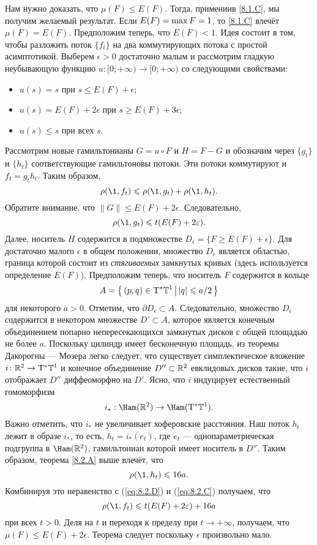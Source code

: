 Нам нужно доказать, что $\mu (F) \le E (F)$.
Тогда, примениив \ref{8.1.C}, мы получим желаемый результат.
Если $E (F) \z= \max F = 1$, то \ref{8.1.C} влечёт $\mu (F) = E (F)$.
Предположим теперь, что $E (F) <1$.
Идея состоит в том, чтобы разложить поток $\{f_t\}$ на два
коммутирующих потока с простой асимптотикой. 
Выберем $\epsilon> 0$ достаточно малым и рассмотрим гладкую
неубывающую функцию $u: [0; + \infty) \to [0; + \infty)$ со следующими
    свойствами:  
\begin{itemize}
\item $u (s) = s$ при $s \le E (F) + \epsilon$;
\item $u (s) = E (F) + 2\epsilon$ при $s \ge E (F) + 3\epsilon$;
\item $u (s) \le s$ при всех $s$.
\end{itemize}
Рассмотрим новые гамильтонианы $G = u \circ F$ и $H = F - G$ и
обозначим через $\{g_t\}$ и $\{h_t\}$ соответствующие гамильтоновы
потоки. 
Эти потоки коммутируют и $f_t = g_t h_t$. 
Таким образом, 
\begin{equation}\rho (\1, f_t) \le \rho (\1, g_t) + \rho (\1, h_t).
\label{eq:8.2.C}
\end{equation}
Обратите внимание, что $\| G \| \le E (F) + 2\epsilon$.
Следовательно, 
\begin{equation}
 \rho (\1, g_t) \le t (E (F) + 2\epsilon).
\label{eq:8.2.D}
\end{equation}
Далее, носитель $H$ содержится в подмножестве $D_\epsilon = \{F \ge E
(F) + \epsilon\}$. 
Для достаточно малого $\epsilon$ в общем положении, множество
$D_\epsilon$ является областью, граница которой состоит из {}\emph{стягиваемых}
замкнутых кривых (здесь используется определение $E(F)$). 
Предположим теперь, что носитель $F$ содержится в кольце 
\[A = \left\{ \,{(p, q) \in \mathrm{T}^\ast\mathbb{T}^1}\, \middle| \,{| q | \leqslant a / 2}\, \right\}\]
для некоторого $a> 0$. 
Отметим, что $\partial D_\epsilon \subset A$.
Следовательно, множество $D_\epsilon$ содержится в некотором множестве
$D' \subset A$, которое является конечным объединением попарно
непересекающихся замкнутых дисков с общей площадью не более $a$. 
Поскольку цилиндр имеет бесконечную площадь, из теоремы
Дакорогны --- Мозера \cite[1.6]{HZ} легко следует, что существует
симплектическое вложение $i\colon \mathbb{R}^2 \to\mathrm{T}^\ast \mathbb{T}^1$ и конечное
объединение $D'' \subset \mathbb{R}^2$ евклидовых дисков такие, что $i$
отображает $D''$ диффеоморфно на $D'$. 
Ясно, что $i$ индуцирует естественный гомоморфизм 
\[i_\ast: \Ham (\RR^2) \to \Ham (\T^\ast \TT^1).\]
Важно отметить, что $i_\ast$ не увеличивает хоферовские расстояния.
Наш поток $h_t$ лежит в образе $i_\ast$, то есть, $h_t = i_\ast (e_{t})$,
где $e_{t}$ --- однопараметрическая подгруппа в $\Ham (\RR^2)$,
гамильтониан которой имеет носитель в $D''$. 
Таким образом, теорема \ref{8.2.A} выше влечёт, что 
\[
\rho (\1, h_t) \le 16a.
\]
Комбинируя это неравенство с (\ref{eq:8.2.D}) и (\ref{eq:8.2.C}) получаем, что
\begin{equation}
  \rho (\1, f_t) \le t (E (F) + 2\epsilon) + 16a 
  \label{eq:8.2.E} 
\end{equation}
при всех $t> 0$.
Деля на $t$ и переходя к пределу при $t \to + \infty$, получаем, что
$\mu (F) \le E (F) + 2\epsilon$. 
Теорема следует поскольку $\epsilon$ произвольно мало.
\qeds

